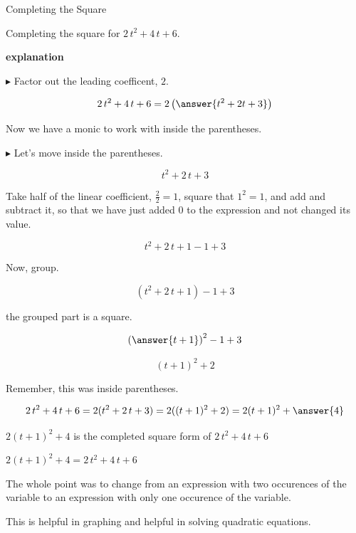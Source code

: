 \documentclass{ximera}
\begin{document}
\begin{example} Completing the Square



Completing the square for $2 \, t^2 + 4 \, t + 6$.


\textbf{\textcolor{red!75!green}{explanation}} 

$\blacktriangleright$ Factor out the leading coefficent, $2$.

\[     2 \, t^2 + 4 \, t + 6 = 2 \left( \answer{t^2 + 2t + 3} \right)   \] 


Now we have a monic to work with inside the parentheses. 


$\blacktriangleright$ Let's move inside the parentheses.

\[ t^2 + 2 \, t + 3 \]

Take half of the linear coefficient, $\frac{2}{2} = 1$, square that $1^2 = 1$, and add and subtract it, so that we have just added $0$ to the expression and not changed its value.


\[ t^2 + 2 \, t + 1 - 1 +3 \]


Now, group.

\[ (t^2 + 2 \, t + 1)- 1 +3 \]

the grouped part is a square.

\[ \left( \answer{t+1} \right)^2- 1 +3 \]

\[ (t+1)^2 + 2 \]

Remember, this was inside parentheses.

\[     2 \, t^2 + 4 \, t + 6 = 2 (t^2 + 2 \, t + 3)  = 2 ((t+1)^2 + 2) =  2 (t+1)^2 + \answer{4}\] 


$2 (t+1)^2 + 4$ is the completed square form of $2 \, t^2 + 4 \, t + 6$ 


$2 (t+1)^2 + 4 = 2 \, t^2 + 4 \, t + 6$





\end{example}














The whole point was to change from an expression with two occurences of the variable to an expression with only one occurence of the variable.

This is helpful in graphing and helpful in solving quadratic equations.
\end{document}
